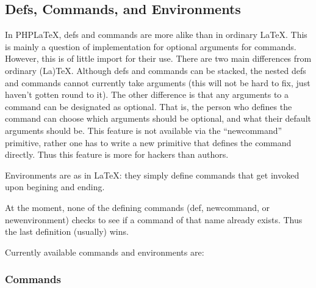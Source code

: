 \documentclass{webpage}
\begin{document}
\subsection{Defs, Commands, and Environments}

In PHPLaTeX, defs and commands are more alike than in ordinary LaTeX.
This is mainly a question of implementation for optional arguments for commands.
However, this is of little import for their use.
There are two main differences from ordinary (La)TeX.
Although defs and commands can be stacked, the nested defs and commands cannot currently take arguments (this will not be hard to fix, just haven't gotten round to it).
The other difference is that any arguments to a command can be designated as optional.
That is, the person who defines the command can choose which arguments should be optional, and what their default arguments should be.
This feature is not available via the ``newcommand'' primitive, rather one has to write a new primitive that defines the command directly.
Thus this feature is more for hackers than authors.

Environments are as in LaTeX: they simply define commands that get invoked upon begining and ending.

At the moment, none of the defining commands (def, newcommand, or newenvironment) checks to see if a command of that name already exists.
Thus the last definition (usually) wins.

Currently available commands and environments are:

\subsubsection{Commands}
\end{document}
